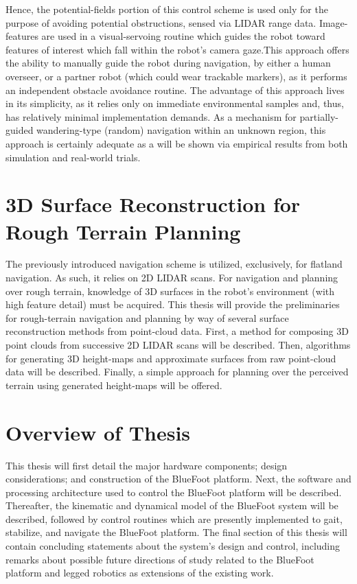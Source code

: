 		Hence, the potential-fields portion of this control scheme is used only for the purpose of avoiding potential obstructions, sensed via LIDAR range data. Image-features are used in a visual-servoing routine which guides the robot toward features of interest which fall within the robot’s camera gaze.This approach offers the ability to manually guide the robot during navigation, by either a human overseer, or a partner robot (which could wear trackable markers), as it performs an independent obstacle avoidance routine. The advantage of this approach lives in its simplicity, as it relies only on immediate environmental samples and, thus, has relatively minimal implementation demands.  As a mechanism for partially-guided wandering-type (random) navigation within an unknown region, this approach is certainly adequate as a will be shown via empirical results from both simulation and real-world trials.




	\section{3D Surface Reconstruction for Rough Terrain Planning}

		The previously introduced navigation scheme is utilized, exclusively, for flatland navigation. As such, it relies on 2D LIDAR scans. For navigation and planning over rough terrain, knowledge of 3D surfaces in the robot’s environment (with high feature detail) must be acquired. This thesis will provide the preliminaries for rough-terrain navigation and planning by way of several surface reconstruction methods from point-cloud data. First, a method for composing 3D point clouds from successive 2D LIDAR scans will be described. Then, algorithms for generating 3D height-maps and approximate surfaces from raw point-cloud data will be described. Finally, a simple approach for planning over the perceived terrain using generated height-maps will be offered.




	\section{Overview of Thesis}

		This thesis will first detail the major hardware components; design considerations; and construction of the BlueFoot platform. Next, the software and processing architecture used to control the BlueFoot platform will be described. Thereafter, the kinematic and dynamical model of the BlueFoot system will be described, followed by control routines which are presently implemented to gait, stabilize, and navigate the BlueFoot platform. The final section of this thesis will contain concluding statements about the system's design and control, including remarks about possible future directions of study related to the BlueFoot platform and legged robotics as extensions of the existing work.
